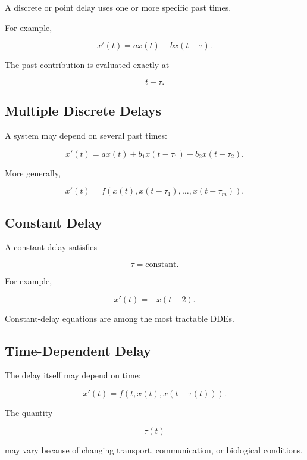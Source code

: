 A discrete or point delay uses one or more specific past times.

For example,

\[
\boxed{
x'(t)
=
ax(t)
+
bx(t-\tau).
}
\]

The past contribution is evaluated exactly at

\[
t-\tau.
\]

\subsection{Multiple Discrete Delays}
\label{subsec:multiple-discrete-delays}

A system may depend on several past times:

\[
\boxed{
x'(t)
=
ax(t)
+
b_1x(t-\tau_1)
+
b_2x(t-\tau_2).
}
\]

More generally,

\[
\boxed{
x'(t)
=
f
\left(
x(t),
x(t-\tau_1),
\ldots,
x(t-\tau_m)
\right).
}
\]

\subsection{Constant Delay}
\label{subsec:constant-delay}

A constant delay satisfies

\[
\boxed{
\tau=\text{constant}.
}
\]

For example,

\[
\boxed{
x'(t)
=
-x(t-2).
}
\]

Constant-delay equations are among the most tractable DDEs.

\subsection{Time-Dependent Delay}
\label{subsec:time-dependent-delay}

The delay itself may depend on time:

\[
\boxed{
x'(t)
=
f
\left(
t,
x(t),
x(t-\tau(t))
\right).
}
\]

The quantity

\[
\tau(t)
\]

may vary because of changing transport, communication, or biological
conditions.

